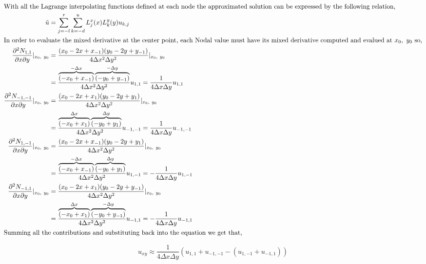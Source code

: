\pagebreak
\pagestyle{fancy}
\restoregeometry

\begin{align*}
    \shortintertext{With all the Lagrange interpolating functions defined at each node the approximated solution can be expressed by the following relation,}
    \tilde{u} & = \sum_{j = -l}^{r}\sum_{k=-d}^{u}L_{j}^x(x)L_{k}^y(y)u_{k,j}\\
    \shortintertext{In order to evaluate the mixed derivative at the center point, each Nodal value must have its mixed derivative computed and evalued at $x_0,\ y_0$ so,}
    \frac{\partial ^2N_{1,1}}{\partial x\partial y}|_{x_0,\ y_0} & = \frac{(x_0 - 2x + x_{-1})(y_0 - 2y + y_{-1})}{4\Delta x^2\Delta y^2}|_{x_0,\ y_0}\\
    & = \frac{ \overbrace{(-x_0 + x_{-1})}^{-\Delta x} \overbrace{(-y_0 + y_{-1})}^{-\Delta y}}{4\Delta x^2 \Delta y^2}u_{1,1} = \frac{1}{4\Delta x\Delta y}u_{1,1}\\
    \frac{\partial ^2N_{-1,-1}}{\partial x\partial y}|_{x_0,\ y_0} & = \frac{(x_0 - 2x + x_{1})(y_0 - 2y + y_{1})}{4\Delta x^2\Delta y^2}|_{x_0,\ y_0}\\
    & = \frac{ \overbrace{(-x_0 + x_{1})}^{\Delta x} \overbrace{(-y_0 + y_{1})}^{\Delta y}}{4\Delta x^2 \Delta y^2}u_{-1,-1} = \frac{1}{4\Delta x\Delta y}u_{-1,-1}\\
    \frac{\partial ^2N_{1,-1}}{\partial x\partial y}|_{x_0,\ y_0} & = \frac{(x_0 - 2x + x_{-1})(y_0 - 2y + y_{1})}{4\Delta x^2\Delta y^2}|_{x_0,\ y_0}\\
    & = \frac{ \overbrace{(-x_0 + x_{-1})}^{-\Delta x} \overbrace{(-y_0 + y_{1})}^{\Delta y}}{4\Delta x^2 \Delta y^2}u_{1,-1} = -\frac{1}{4\Delta x\Delta y}u_{1,-1}\\
    \frac{\partial ^2N_{-1,1}}{\partial x\partial y}|_{x_0,\ y_0} & = \frac{(x_0 - 2x + x_{1})(y_0 - 2y + y_{-1})}{4\Delta x^2\Delta y^2}|_{x_0,\ y_0}\\
    & = \frac{ \overbrace{(-x_0 + x_{1})}^{\Delta x} \overbrace{(-y_0 + y_{-1})}^{-\Delta y}}{4\Delta x^2 \Delta y^2}u_{-1,1} = -\frac{1}{4\Delta x\Delta y}u_{-1,1}\\
    \shortintertext{Summing all the contributions and substituting back into the equation we get that,}
\end{align*}

\vspace{-0.2in}
\begin{equation*}
    \boxed{u_{xy} \approx \frac{1}{4\Delta x\Delta y}\left(u_{1,1} + u_{-1,-1} - \left(u_{1,-1} + u_{-1,1}\right)\right)}
\end{equation*}
